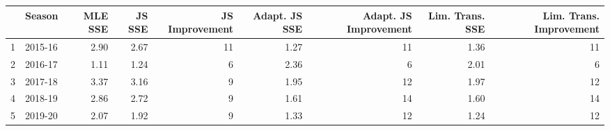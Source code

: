 \begin{table}[ht]
\centering
\begin{tabular}{rlrrrrrrr}
  \hline
 & Season & MLE SSE & JS SSE & JS Improvement & Adapt. JS SSE & Adapt. JS Improvement & Lim. Trans. SSE & Lim. Trans. Improvement \\ 
  \hline
1 & 2015-16 & 2.90 & 2.67 &  11 & 1.27 &  11 & 1.36 &  11 \\ 
  2 & 2016-17 & 1.11 & 1.24 &   6 & 2.36 &   6 & 2.01 &   6 \\ 
  3 & 2017-18 & 3.37 & 3.16 &   9 & 1.95 &  12 & 1.97 &  12 \\ 
  4 & 2018-19 & 2.86 & 2.72 &   9 & 1.61 &  14 & 1.60 &  14 \\ 
  5 & 2019-20 & 2.07 & 1.92 &   9 & 1.33 &  12 & 1.24 &  12 \\ 
   \hline
\end{tabular}
\end{table}
